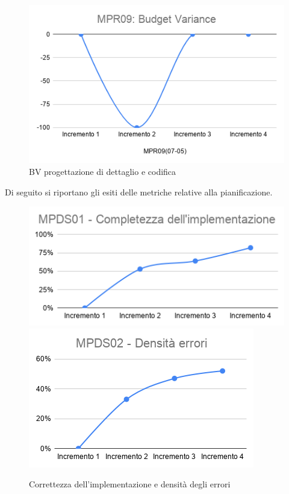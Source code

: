 \begin{figure}[h!]
	\centering
	\includegraphics[scale=0.6]{Immagini/BV_PDettaglio.png}
	\caption{BV progettazione di dettaglio e codifica}
	\label{fig:BV_PDettaglio}
\end{figure}
Di seguito si riportano gli esiti delle metriche relative alla pianificazione.
\begin{figure}[h!]
	\includegraphics[scale=0.6]{Immagini/MPDS01_CompletezzaImpl.png}\quad
	\includegraphics[scale=0.6]{Immagini/MPDS02_DErrori.png}
	\caption{Correttezza dell'implementazione e densità degli errori}
	\label{fig:DensitàErr}
\end{figure}
